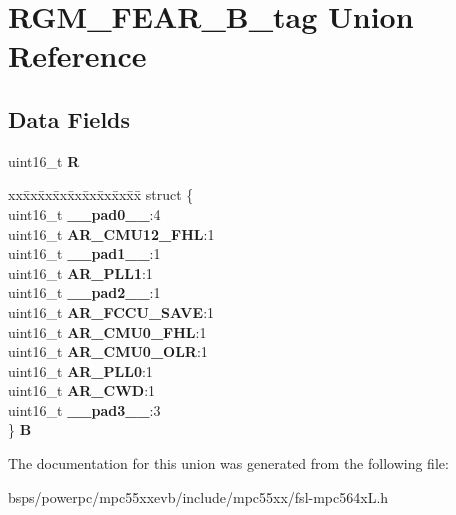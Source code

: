 \hypertarget{unionRGM__FEAR__16B__tag}{}\section{R\+G\+M\+\_\+\+F\+E\+A\+R\+\_\+B\+\_\+tag Union Reference}
\label{unionRGM__FEAR__16B__tag}
\subsection*{Data Fields}
\begin{DoxyCompactItemize}
\item 
\mbox{\label{unionRGM__FEAR__16B__tag_a239fc2f9ea0995085bc9b25751df9c3c}} 
uint16\+\_\+t {\bfseries R}
\item 
\mbox{\label{unionRGM__FEAR__16B__tag_a3ce87661934f8cef997bfa54710d477c}} 
\begin{tabbing}
xx\=xx\=xx\=xx\=xx\=xx\=xx\=xx\=xx\=\kill
struct \{\\
\>uint16\_t {\bfseries \_\_pad0\_\_}:4\\
\>uint16\_t {\bfseries AR\_CMU12\_FHL}:1\\
\>uint16\_t {\bfseries \_\_pad1\_\_}:1\\
\>uint16\_t {\bfseries AR\_PLL1}:1\\
\>uint16\_t {\bfseries \_\_pad2\_\_}:1\\
\>uint16\_t {\bfseries AR\_FCCU\_SAVE}:1\\
\>uint16\_t {\bfseries AR\_CMU0\_FHL}:1\\
\>uint16\_t {\bfseries AR\_CMU0\_OLR}:1\\
\>uint16\_t {\bfseries AR\_PLL0}:1\\
\>uint16\_t {\bfseries AR\_CWD}:1\\
\>uint16\_t {\bfseries \_\_pad3\_\_}:3\\
\} {\bfseries B}\\

\end{tabbing}\end{DoxyCompactItemize}


The documentation for this union was generated from the following file\+:\begin{DoxyCompactItemize}
\item 
bsps/powerpc/mpc55xxevb/include/mpc55xx/fsl-\/mpc564x\+L.\+h\end{DoxyCompactItemize}
